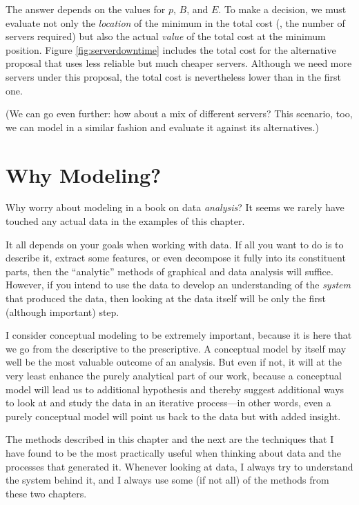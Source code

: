 The answer depends on the values for $p$, $B$, and $E$. To make a
decision, we must evaluate not only the \emph{location} of the minimum
in the total cost (\ie, the number of servers required) but also the
actual \emph{value} of the total cost at the minimum position. Figure
\ref{fig:serverdowntime} includes the total cost for the alternative
proposal that uses less reliable but much cheaper servers. Although we
need more servers under this proposal, the total cost is nevertheless
lower than in the first one.

(We can go even further: how about a mix of different servers? This
scenario, too, we can model in a similar fashion and evaluate it 
against its alternatives.)


\section{Why Modeling?}


Why worry about modeling in a book on data \emph{analysis}?  It seems
we rarely have touched any actual data in the examples of this
chapter.

It all depends on your goals when working with data. If all you want
to do is to describe it, extract some features, or even decompose it
fully into its constituent parts, then the ``analytic'' methods of
graphical and data analysis will suffice. However, if you intend to
use the data to develop an understanding of the \emph{system} that
produced the data, then looking at the data itself will be only the
first (although important) step.

I consider conceptual modeling to be extremely important, because it
is here that we go from the descriptive to the prescriptive. A
conceptual model by itself may well be the most valuable outcome of an
analysis. But even if not, it will at the very least enhance the
purely analytical part of our work, because a conceptual model will
lead us to additional hypothesis and thereby suggest additional ways
to look at and study the data in an iterative process---in other
words, even a purely conceptual model will point us back to the data
but with added insight.

The methods described in this chapter and the next are the techniques
that I have found to be the most practically useful when thinking
about data and the processes that generated it. Whenever looking at
data, I always try to understand the system behind it, and I always
use some (if not all) of the methods from these two chapters.


